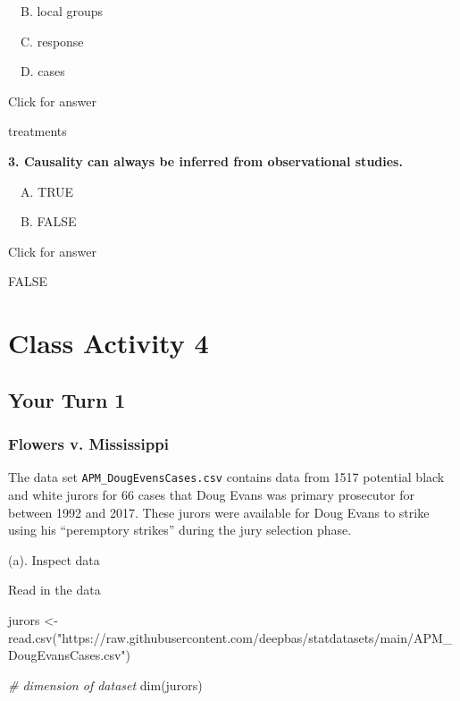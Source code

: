 \documentclass[
]{book}
\newenvironment{Shaded}{\begin{snugshade}}{\end{snugshade}}
\newcommand{\CommentTok}[1]{\textcolor[rgb]{0.56,0.35,0.01}{\textit{#1}}}
\newcommand{\FunctionTok}[1]{\textcolor[rgb]{0.00,0.00,0.00}{#1}}
\newcommand{\NormalTok}[1]{#1}
\newcommand{\OtherTok}[1]{\textcolor[rgb]{0.56,0.35,0.01}{#1}}
\newcommand{\StringTok}[1]{\textcolor[rgb]{0.31,0.60,0.02}{#1}}
\begin{document}
 B. local groups

 C. response

 D. cases

Click for answer

treatments

\textbf{3. Causality can always be inferred from observational studies.}

 A. TRUE

 B. FALSE

Click for answer

FALSE

\hypertarget{class-activity-4}{%
\chapter{Class Activity 4}\label{class-activity-4}}

\hypertarget{your-turn-1-2}{%
\section{Your Turn 1}\label{your-turn-1-2}}

\hypertarget{flowers-v.-mississippi}{%
\subsection{Flowers v. Mississippi}\label{flowers-v.-mississippi}}

The data set \texttt{APM\_DougEvensCases.csv} contains data from 1517 potential black and white jurors for 66 cases that Doug Evans was primary prosecutor for between 1992 and 2017. These jurors were available for Doug Evans to strike using his ``peremptory strikes'' during the jury selection phase.

(a). Inspect data

Read in the data

\begin{Shaded}
\begin{Highlighting}[]
\NormalTok{jurors }\OtherTok{\textless{}{-}} \FunctionTok{read.csv}\NormalTok{(}\StringTok{"https://raw.githubusercontent.com/deepbas/statdatasets/main/APM\_DougEvansCases.csv"}\NormalTok{)}
\end{Highlighting}
\end{Shaded}

\begin{Shaded}
\begin{Highlighting}[]
\CommentTok{\# dimension of dataset}
\FunctionTok{dim}\NormalTok{(jurors)}
\end{Highlighting}
\end{Shaded}
\end{document}
